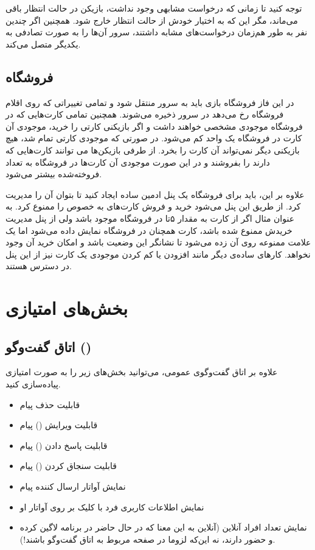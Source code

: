 \documentclass[]{article}
\begin{document}
توجه کنید تا زمانی که درخواست مشابهی وجود نداشت، بازیکن در حالت انتظار باقی می‌ماند، مگر این که به اختیار خودش از حالت انتظار خارج شود. همچنین اگر چندین نفر به طور هم‌زمان درخواست‌های مشابه داشتند، سرور آن‌ها را به صورت تصادفی به یکدیگر متصل می‌کند.

\subsection*{{\titr فروشگاه}}
در این فاز فروشگاه بازی باید به سرور منتقل شود و تمامی تغییراتی که روی اقلام فروشگاه رخ می‌دهد در سرور ذخیره می‌شوند. همچنین تمامی کارت‌هایی که در فروشگاه موجودی مشخصی خواهند داشت و اگر بازیکنی کارتی را خرید، موجودی آن کارت در فروشگاه یک واحد کم می‌شود. در صورتی که موجودی کارتی تمام شد، هیچ بازیکنی دیگر نمی‌تواند آن کارت را بخرد. از طرفی بازیکن‌ها می توانند کارت‌هایی که دارند را بفروشند و در این صورت موجودی آن کارت‌ها در فروشگاه به تعداد فروخته‌شده بیشتر می‌شود.

علاوه بر این، باید برای فروشگاه یک پنل ادمین ساده ایجاد کنید تا بتوان آن را مدیریت کرد. از طریق این پنل می‌شود خرید و فروش کارت‌های به خصوص را ممنوع کرد. به عنوان مثال اگر از کارت  به مقدار ۵تا در فروشگاه موجود باشد ولی از پنل مدیریت خریدش ممنوع شده باشد، کارت همچنان در فروشگاه نمایش داده می‌شود اما یک علامت ممنوعه روی آن زده می‌شود تا نشانگر این وضعیت باشد و امکان خرید آن وجود نخواهد. کارهای ساده‌ی دیگر مانند افزودن یا کم کردن موجودی یک کارت نیز از این پنل در دسترس هستند.


\section*{{\titr بخش‌های امتیازی}}

\subsection*{{\titr اتاق گفت‌وگو ()}}

علاوه بر اتاق گفت‌و‌گوی عمومی، می‌توانید بخش‌های زیر را به صورت امتیازی پیاده‌سازی کنید.

\begin{itemize}
	\item قابلیت حذف پیام
	\item  قابلیت ویرایش () پیام
	\item قابلیت پاسخ دادن () پیام
	\item قابلیت سنجاق کردن () پیام
	\item نمایش آواتار ارسال کننده پیام
	\item نمایش اطلاعات کاربری فرد با کلیک بر روی آواتار او
	\item نمایش تعداد افراد آنلاین (آنلاین به این معنا که در حال حاضر در برنامه لاگین کرده و حضور دارند، نه این‌که لزوما در صفحه مربوط به اتاق گفت‌وگو باشند!).
\end{itemize}
\end{document}
